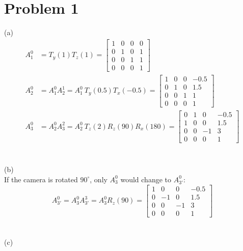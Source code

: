 \documentclass[twoside,11pt]{homework}
\date{\today} %
\begin{document}
\maketitle

\section*{Problem 1}
(a)\\
%
\begin{equation}
\begin{split}
A_1^0 &= T_y(1)T_z(1) = \left[
\begin{matrix}
1 & 0 & 0 & 0 \\
0 & 1& 0 & 1 \\
0 & 0 & 1 & 1\\
0 & 0 & 0 & 1
\end{matrix}
\right] 
\\
A_2^0 &= A_1^0 A_2^1 = A_1^0\ T_y(0.5) T_x(-0.5) = \left[
\begin{matrix}
1 & 0 & 0 & -0.5 \\
0 & 1 & 0 & 1.5 \\
0 & 0 & 1 & 1 \\
0 & 0 & 0 & 1
\end{matrix}
\right]
\\
A_3^0 &= A_2^0 A_3^2 = A_2^0\ T_z(2)R_z(90)R_x(180) = \left[
\begin{matrix}
0 & 1 & 0 & -0.5 \\
1 & 0 & 0 & 1.5 \\
0 & 0 & -1 & 3 \\
0 & 0 & 0 & 1
\end{matrix}
\right]
\end{split}
\end{equation}
%
\\\\
(b)\\
If the camera is rotated $90^{\circ}$, only $A_3^0$ would change to $A_{3'}^0$:
%
\begin{equation}
A_{3'}^0 = A_3^0 A_{3'}^3 = A_3^0 R_z(90)= \left[
\begin{matrix}
1 & 0 & 0 & -0.5 \\
0 & -1 & 0 & 1.5 \\
0 & 0 & -1 & 3 \\
0 & 0 & 0 & 1
\end{matrix}
\right]
\end{equation}
%
\\\\
(c)\\
\end{document}
